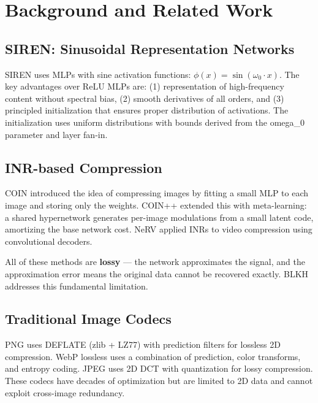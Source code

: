 \documentclass[11pt,a4paper]{article}
\begin{document}
\section{Background and Related Work}

\subsection{SIREN: Sinusoidal Representation Networks}

SIREN \cite{sitzmann2020siren} uses MLPs with sine activation functions: $\phi(x) = \sin(\omega_0 \cdot x)$. The key advantages over ReLU MLPs are: (1) representation of high-frequency content without spectral bias, (2) smooth derivatives of all orders, and (3) principled initialization that ensures proper distribution of activations. The initialization uses uniform distributions with bounds derived from the omega\_0 parameter and layer fan-in.

\subsection{INR-based Compression}

COIN \cite{dupont2021coin} introduced the idea of compressing images by fitting a small MLP to each image and storing only the weights. COIN++ \cite{dupont2022coin++} extended this with meta-learning: a shared hypernetwork generates per-image modulations from a small latent code, amortizing the base network cost. NeRV \cite{chen2021nerv} applied INRs to video compression using convolutional decoders.

All of these methods are \textbf{lossy} --- the network approximates the signal, and the approximation error means the original data cannot be recovered exactly. BLKH addresses this fundamental limitation.

\subsection{Traditional Image Codecs}

PNG uses DEFLATE (zlib + LZ77) with prediction filters for lossless 2D compression. WebP lossless uses a combination of prediction, color transforms, and entropy coding. JPEG uses 2D DCT with quantization for lossy compression. These codecs have decades of optimization but are limited to 2D data and cannot exploit cross-image redundancy.
\end{document}
